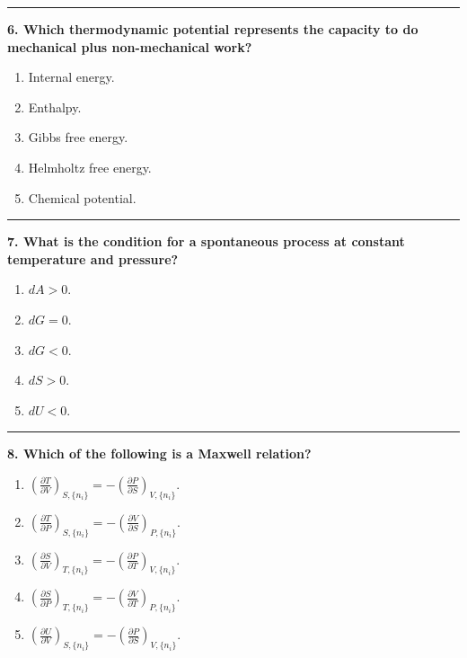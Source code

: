 \documentclass[
  9pt,
]{extbook}
\providecommand{\tightlist}{%
  \setlength{\itemsep}{0pt}\setlength{\parskip}{0pt}}
\theoremstyle{definition}
\theoremstyle{definition}
\theoremstyle{definition}
\theoremstyle{definition}
\theoremstyle{remark}
\begin{document}
\begin{center}\rule{0.5\linewidth}{0.5pt}\end{center}

\textbf{6. Which thermodynamic potential represents the capacity to do mechanical plus non-mechanical work?}

\begin{enumerate}
\def\labelenumi{\alph{enumi}.}
\tightlist
\item
  Internal energy.
\item
  Enthalpy.
\item
  Gibbs free energy.
\item
  Helmholtz free energy.
\item
  Chemical potential.
\end{enumerate}

\begin{center}\rule{0.5\linewidth}{0.5pt}\end{center}

\textbf{7. What is the condition for a spontaneous process at constant temperature and pressure?}

\begin{enumerate}
\def\labelenumi{\alph{enumi}.}
\tightlist
\item
  \(dA > 0\).
\item
  \(dG = 0\).
\item
  \(dG < 0\).
\item
  \(dS > 0\).
\item
  \(dU < 0\).
\end{enumerate}

\begin{center}\rule{0.5\linewidth}{0.5pt}\end{center}

\textbf{8. Which of the following is a Maxwell relation?}

\begin{enumerate}
\def\labelenumi{\alph{enumi}.}
\tightlist
\item
  \(\left(\frac{\partial T}{\partial V}\right)_{S,\{n_i\}} = -\left(\frac{\partial P}{\partial S}\right)_{V,\{n_i\}}\).
\item
  \(\left(\frac{\partial T}{\partial P}\right)_{S,\{n_i\}} = -\left(\frac{\partial V}{\partial S}\right)_{P,\{n_i\}}\).
\item
  \(\left(\frac{\partial S}{\partial V}\right)_{T,\{n_i\}} = -\left(\frac{\partial P}{\partial T}\right)_{V,\{n_i\}}\).
\item
  \(\left(\frac{\partial S}{\partial P}\right)_{T,\{n_i\}} = -\left(\frac{\partial V}{\partial T}\right)_{P,\{n_i\}}\).
\item
  \(\left(\frac{\partial U}{\partial V}\right)_{S,\{n_i\}} = -\left(\frac{\partial P}{\partial S}\right)_{V,\{n_i\}}\).
\end{enumerate}
\end{document}
